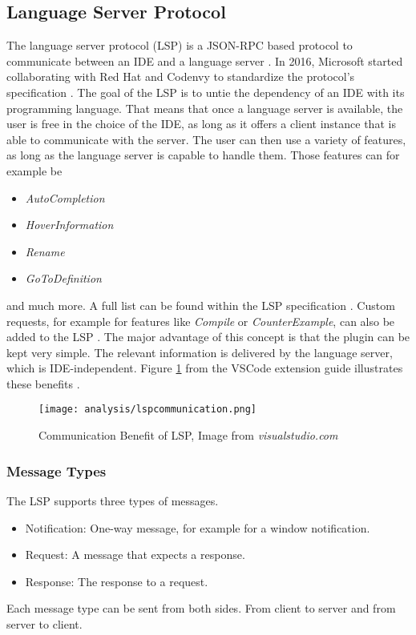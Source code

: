 \subsection{Language Server Protocol}
\label{section:analysis:lsp}
The language server protocol (LSP) is a JSON-RPC based protocol to communicate between an IDE and a language server \cite{lspWiki}. 
In 2016, Microsoft started collaborating with Red Hat and Codenvy to standardize the protocol’s specification \cite{lspWiki}.
The goal of the LSP is to untie the dependency of an IDE with its programming language.
That means that once a language server is available, the user is free in the choice of the IDE, as long as it offers a client instance that is able to communicate with the server.
The user can then use a variety of features, as long as the language server is capable to handle them. 
Those features can for example be
\begin{itemize}
    \item \textit{AutoCompletion}
    \item \textit{HoverInformation}
    \item \textit{Rename}
    \item \textit{GoToDefinition}
\end{itemize}
and much more. A full list can be found within the LSP specification \cite{lspspec}.
Custom requests, for example for features like \textit{Compile} or \textit{CounterExample}, can also be added to the LSP \cite{lspWiki}.
The major advantage of this concept is that the plugin can be kept very simple.
The relevant information is delivered by the language server, which is IDE-independent.
Figure \ref{fig:lspcommunication} from the VSCode extension guide illustrates these benefits .

\begin{figure}[H]
    \centering
    \texttt{[image: analysis/lspcommunication.png]}
    \caption{Communication Benefit of LSP, Image from \textit{visualstudio.com} \cite{lspextensionguide}}
    \label{fig:lspcommunication}
\end{figure}

\subsubsection{Message Types}
The LSP supports three types of messages.
\begin{itemize}
    \item Notification: One-way message, for example for a window notification.
    \item Request: A message that expects a response.
    \item Response: The response to a request.
\end{itemize}
Each message type can be sent from both sides. From client to server and from server to client.

